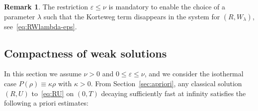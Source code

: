 \documentclass[11pt]{article}
\theoremstyle{definition}
\newtheorem{rema}[theo]{Remark}
\numberwithin{equation}{section}
\numberwithin{figure}{section}
\numberwithin{table}{section}
\newcommand*\<{\left\langle}
\renewcommand*\>{\right\rangle}
\renewcommand*\le{\leqslant}
\begin{document}
\begin{rema}
The restriction $\varepsilon \le \nu$ is mandatory to enable the choice of a parameter $\lambda$ such that the Korteweg term disappears in the system for $(R,W_\lambda)$, see~\eqref{eq:RWlambda-eps}.
\end{rema}

\subsection{Compactness of weak solutions}

In this section we assume $\nu >0$ and $0 \le \varepsilon \le \nu$, and we consider the isothermal case $P(\rho)\equiv \kappa \rho$ with $\kappa >0$. From Section~\ref{sec:apriori}, any classical solution $(R,U)$ to~\eqref{eq:RU} on $(0,T)$ decaying sufficiently fast at infinity satisfies the following a priori estimates:
\end{document}
